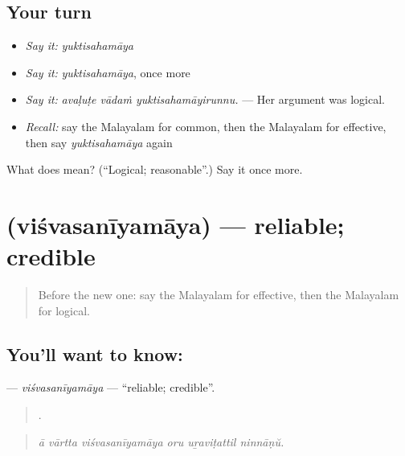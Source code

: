 \subsection*{Your turn}
\begin{itemize}
\raggedright
  \item \emph{Say it:} \emph{yuktisahamāya}
  \item \emph{Say it:} \emph{yuktisahamāya}, once more
  \item \emph{Say it:} \emph{avaḷuṭe vādaṁ yuktisahamāyirunnu.} — Her argument was logical.
  \item \emph{Recall:} say the Malayalam for common, then the Malayalam for effective, then say \emph{yuktisahamāya} again
\end{itemize}

\begin{tcolorbox}[breakable,colback=teal!4,colframe=teal!35!black,title={Before you move on}]
What does  mean? (\textquotedblleft{}Logical; reasonable\textquotedblright{}.) Say it once more.
\end{tcolorbox}
\section[\texorpdfstring{\ml{വിശ്വസനീയമായ} (viśvasanīyamāya)}{വിശ്വസനീയമായ (viśvasanīyamāya)}]{ (viśvasanīyamāya) — reliable; credible}

\label{lesson:ML-C446-visvasaniyamaya}



\begin{quote}
Before the new one: say the Malayalam for effective, then the Malayalam for logical.
\end{quote}

\subsection*{You'll want to know: }
\textbf{} — \emph{viśvasanīyamāya} — \textquotedblleft{}reliable; credible\textquotedblright{}.

\begin{quote}
     .
\end{quote}

\begin{quote}
\emph{ā vārtta viśvasanīyamāya oru uṟaviṭattil ninnāṇŭ.}
\end{quote}

